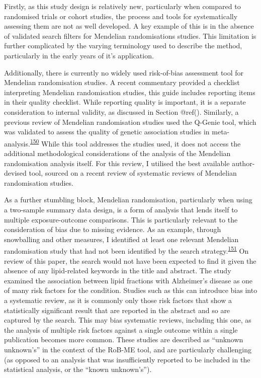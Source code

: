 \documentclass[a4paper, twoside]{templates/ociamthesis}
\begin{document}
Firstly, as this study design is relatively new, particularly when compared to randomised trials or cohort studies, the process and tools for systematically assessing them are not as well developed. A key example of this is in the absence of validated search filters for Mendelian randomisations studies. This limitation is further complicated by the varying terminology used to describe the method, particularly in the early years of it's application.

Additionally, there is currently no widely used risk-of-bias assessment tool for Mendelian randomisation studies. A recent commentary provided a checklist interpreting Mendelian randomisation studies, this guide includes reporting items in their quality checklist. While reporting quality is important, it is a separate consideration to internal validity, as discussed in Section @ref(). Similarly, a previous review of Mendelian randomisation studies used the Q-Genie tool, which was validated to assess the quality of genetic association studies in meta-analysis.\textsuperscript{\protect\hyperlink{ref-sohani2015}{150}} While this tool addresses the studies used, it does not access the additional methodological considerations of the analysis of the Mendelian randomisation analysis itself. For this review, I utilised the best available author-devised tool, sourced on a recent review of systematic reviews of Mendelian randomisation studies.

As a further stumbling block, Mendelian randomisation, particularly when using a two-sample summary data design, is a form of analysis that lends itself to multiple exposure-outcome comparisons. This is particularly relevant to the consideration of bias due to missing evidence. As an example, through snowballing and other measures, I identified at least one relevant Mendelian randomisation study that had not been identified by the search strategy.\textsuperscript{\protect\hyperlink{ref-larsson2017b}{151}} On review of this paper, the search would not have been expected to find it given the absence of any lipid-related keywords in the title and abstract. The study examined the association between lipid fractions with Alzheimer's disease as one of many risk factors for the condition. Studies such as this can introduce bias into a systematic review, as it is commonly only those risk factors that show a statistically significant result that are reported in the abstract and so are captured by the search. This may bias systematic reviews, including this one, as the analysis of multiple risk factors against a single outcome within a single publication becomes more common. These studies are described as ``unknown unknown's'' in the context of the RoB-ME tool, and are particularly challenging (as opposed to an analysis that was insufficiently reported to be included in the statistical analysis, or the ``known unknown's'').
\end{document}
